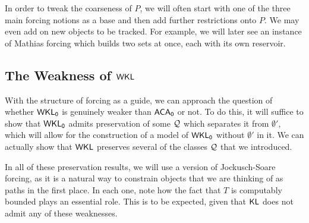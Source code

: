 \documentclass{amsart}
\begin{document}
	In order to tweak the coarseness of $P$, we will often start with one of the three main forcing notions as a base and then add further restrictions onto $P$. We may even add on new objects to be tracked. For example, we will later see an instance of Mathias forcing which builds two sets at once, each with its own reservoir.
	
	
	\subsection{The Weakness of \texorpdfstring{$\sf{WKL}$}{WKL}}
	
	
	With the structure of forcing as a guide, we can approach the question of whether $\operatorname{\sf{WKL_0}}$ is genuinely weaker than $\operatorname{\sf{ACA_0}}$ or not. To do this, it will suffice to show that $\operatorname{\sf{WKL_0}}$ admits preservation of some $\mathcal{Q}$ which separates it from $\emptyset'$, which will allow for the construction of a model of $\operatorname{\sf{WKL_0}}$ without $\emptyset'$ in it. We can actually show that $\sf{WKL}$ preserves several of the classes $\mathcal{Q}$ that we introduced.
	
	In all of these preservation results, we will use a version of Jockusch-Soare forcing, as it is a natural way to constrain objects that we are thinking of as paths in the first place. In each one, note how the fact that $T$ is computably bounded plays an essential role. This is to be expected, given that $\operatorname{\sf{KL}}$ does not admit any of these weaknesses.\\
	
\end{document}
